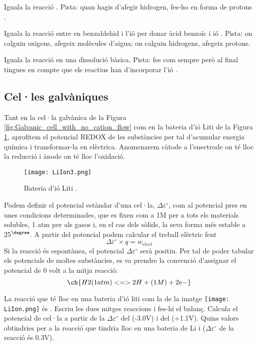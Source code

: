 \begin{exr}
Iguala la reacció . Pista: quan hagis d'afegir hidrogen, fes-ho en forma de protons .
\end{exr}

\begin{exr}
Iguala la reacció entre en benzaldehid i l'ió  per donar àcid benzoïc i ió . Pista: on calguin oxigens, afegeix molècules d'aigua; on calguin hidrogens, afegeix protons.
\end{exr}

\begin{exr}
Iguala la reacció  en una dissolució bàsica. Pista: fes com sempre però al final tingues en compte que els reactius han d'incorporar l'ió .
\end{exr}

\subsection{Cel·les galvàniques}

Tant en la cel·la galvànica de la Figura \ref{fig:Galvanic_cell_with_no_cation_flow} com en la bateria d'ió Liti de la Figura \ref{fig:LiIon3}, aprofitem el potencial REDOX de les substàncies per tal d'acumular energia química i transformar-la en elèctrica. 
Anomenarem càtode a l'enectrode on té lloc la reducció i ànode on té lloc l'oxidació.

\begin{figure}[h]
\centering
\texttt{[image: LiIon3.png]}
\caption{Bateria d'ió Liti \citep{liu_understanding_2016}.}
\label{fig:LiIon3}
\end{figure}

Podem definir el potencial estàndar d'una cel·la, $\Delta \varepsilon^{\circ}$, com al potencial pres en unes condicions determinades, que es fixen com a 1M per a tots els materials solubles, 1 atm per als gasos i, en el cas dels sòlids, la seva forma més estable a 25$^{\degree}$.
A partir del potencial podem calcular el treball elèctric fent
\[\Delta \varepsilon^{\circ} \times q = w_{elect}\]
Si la reacció és espontànea, el potencial $\Delta \varepsilon^{\circ}$ serà positiu.
Per tal de poder tabular els potencials de moltes substàncies, es va prendre la convenció d'assignar el potencial de 0 volt a la mitja reacció:
\[\ch{H2 (1 atm) <=> 2 H+ (1 M) + 2 e-}\]

\begin{exr}
La reacció que té lloc en una bateria d'ió liti com la de la imatge
\texttt{[image: LiIon.png]}
és . Escriu les dues mitges reaccions i fes-hi el balanç. Calcula el potencial de cel·la a partir de la $\Delta \varepsilon^{\circ}$ del  (-3.0V) i del  (+1.1V).
Quins valors obtindries per a la reacció que tindria lloc en una bateria de Li i  ($\Delta \varepsilon^{\circ}$ de la reacció  és 0.3V).
\end{exr}

